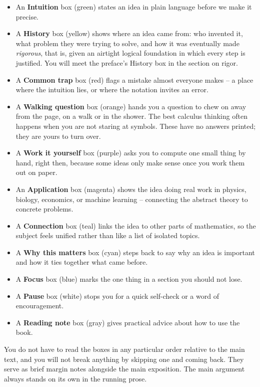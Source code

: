\begin{itemize}
  \item An \textbf{Intuition} box (green) states an idea in plain language before we make it precise.
  \item A \textbf{History} box (yellow) shows where an idea came from: who invented it, what problem they were trying to solve, and how it was eventually made \emph{rigorous}, that is, given an airtight logical foundation in which every step is justified. You will meet the preface's History box in the section on rigor.
  \item A \textbf{Common trap} box (red) flags a mistake almost everyone makes -- a place where the
  intuition lies, or where the notation invites an error.
  \item A \textbf{Walking question} box (orange) hands you a question to chew on away from the page,
  on a walk or in the shower. The best calculus thinking often happens when you are not staring at
  symbols. These have no answers printed; they are yours to turn over.
  \item A \textbf{Work it yourself} box (purple) asks you to compute one small thing by hand, right
  then, because some ideas only make sense once you work them out on paper.
  \item An \textbf{Application} box (magenta) shows the idea doing real work in physics, biology,
  economics, or machine learning -- connecting the abstract theory to concrete problems.
  \item A \textbf{Connection} box (teal) links the idea to other parts of mathematics, so the
  subject feels unified rather than like a list of isolated topics.
  \item A \textbf{Why this matters} box (cyan) steps back to say why an idea is important and how it
  ties together what came before.
  \item A \textbf{Focus} box (blue) marks the one thing in a section you should not lose.
  \item A \textbf{Pause} box (white) stops you for a quick self-check or a word of encouragement.
  \item A \textbf{Reading note} box (gray) gives practical advice about how to use the book.
\end{itemize}

\begin{marginnotebox}
You do not have to read the boxes in any particular order relative to the main text, and you will
not break anything by skipping one and coming back. They serve as brief margin notes alongside the main exposition. The main argument always stands on its own in the running prose.
\end{marginnotebox}


